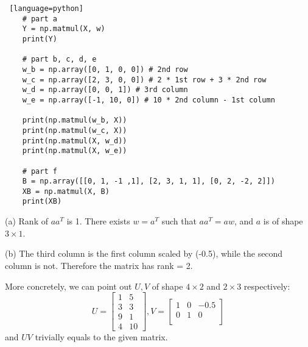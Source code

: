 \documentclass[a4paper, 12pt]{article}
\begin{document}
\begin{solution}
\begin{lstlisting} [language=python]
    # part a
    Y = np.matmul(X, w)
    print(Y)
    
    # part b, c, d, e
    w_b = np.array([0, 1, 0, 0]) # 2nd row
    w_c = np.array([2, 3, 0, 0]) # 2 * 1st row + 3 * 2nd row
    w_d = np.array([0, 0, 1]) # 3rd column
    w_e = np.array([-1, 10, 0]) # 10 * 2nd column - 1st column
    
    print(np.matmul(w_b, X))
    print(np.matmul(w_c, X))
    print(np.matmul(X, w_d))
    print(np.matmul(X, w_e))

    # part f
    B = np.array([[0, 1, -1 ,1], [2, 3, 1, 1], [0, 2, -2, 2]])
    XB = np.matmul(X, B)
    print(XB)
    \end{lstlisting}
\end{solution}

\begin{problem}
\end{problem}
\begin{solution}
    (a) Rank of $aa^T$ is 1. There exists $w = a^T$ such that $aa^T = aw$, and $a$ is of shape $3 \times 1$.

    (b) The third column is the first column scaled by (-0.5), while the second column is not. Therefore the matrix has rank = 2.

    More concretely, we can point out $U, V$ of shape $4 \times 2$ and $2 \times 3$ respectively:
    \[
        U = \begin{bmatrix}
            1 & 5  \\
            3 & 3  \\
            9 & 1  \\
            4 & 10
        \end{bmatrix}, V = \begin{bmatrix}
            1 & 0 & -0.5 \\
            0 & 1 & 0    \\
        \end{bmatrix}
    \]
    and $UV$ trivially equals to the given matrix.
\end{solution}
\end{document}
